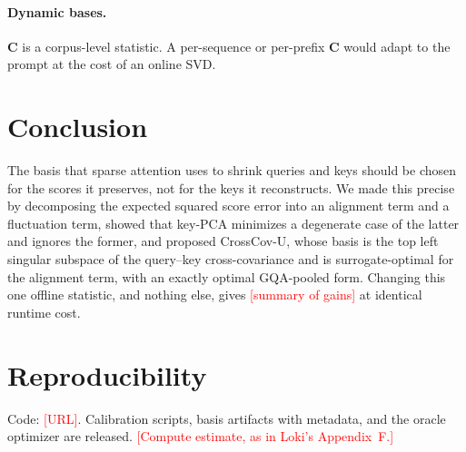 \documentclass[10pt]{article}
\newcommand{\TODO}[1]{\textcolor{red}{[#1]}}
\newcommand{\bC}{\mathbf{C}}
\newcommand{\method}{CrossCov-U}
\theoremstyle{plain}
\theoremstyle{definition}
\theoremstyle{remark}
\begin{document}
\paragraph{Dynamic bases.} $\bC$ is a corpus-level statistic. A per-sequence
or per-prefix $\bC$ would adapt to the prompt at the cost of an online SVD.

\section{Conclusion}
\label{sec:conclusion}

The basis that sparse attention uses to shrink queries and keys should be
chosen for the scores it preserves, not for the keys it reconstructs. We
made this precise by decomposing the expected squared score error into an
alignment term and a fluctuation term, showed that key-PCA minimizes a
degenerate case of the latter and ignores the former, and proposed
\method{}, whose basis is the top left singular subspace of the query--key
cross-covariance and is surrogate-optimal for the alignment term, with an
exactly optimal GQA-pooled form. Changing this one offline statistic, and
nothing else, gives \TODO{summary of gains} at identical runtime cost.

\section*{Reproducibility}
Code: \TODO{URL}. Calibration scripts, basis artifacts with metadata, and the
oracle optimizer are released. \TODO{Compute estimate, as in Loki's Appendix~F.}
\end{document}
